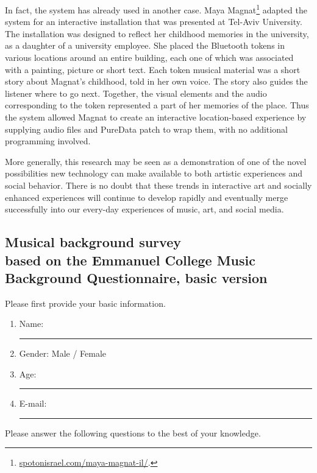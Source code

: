 \documentclass[a4paper,11pt]{article}
\newcommand{\myunderline}{\rule{2in}{.5pt}}
\begin{document}
{In fact, the system has already used in another case.
Maya Magnat\footnote{\href{http://spotonisrael.com/maya-magnat-il/}{spotonisrael.com/maya-magnat-il/}.} adapted the system for an interactive installation that was presented at Tel-Aviv University.
The installation was designed to reflect her childhood memories in the university, as a daughter of a university employee.
She placed the Bluetooth tokens in various locations around an entire building, each one of which was associated with a painting, picture or short text.
Each token musical material was a short story about Magnat's childhood, told in her own voice.
The story also guides the listener where to go next.
Together, the visual elements and the audio corresponding to the token represented a part of her memories of the place.
Thus the system allowed Magnat to create an interactive location-based experience by supplying audio files and PureData patch to wrap them, with no additional programming involved.

More generally, this research may be seen as a demonstration of one of the novel possibilities new technology can make available to both artistic experiences and social behavior.
There is no doubt that these trends in interactive art and socially enhanced experiences will continue to develop rapidly and eventually merge successfully into our every-day experiences of music, art, and social media.

\sloppy  %
\clearpage\printbibliography[title={Bibliography},heading=bibintoc]

\clearpage\begin{appendices}

\section[Musical background survey]{Musical background survey\\
	{\normalsize based on the Emmanuel College Music Background Questionnaire, basic version}}

Please first provide your basic information.

\begin{enumerate}
	\item Name: \myunderline
	\item Gender: Male / Female
	\item Age: \myunderline
	\item E-mail: \myunderline
\end{enumerate}
Please answer the following questions to the best of your knowledge.
\begin{enumerate}[resume]


\end{enumerate}
\end{appendices}}
\end{document}
